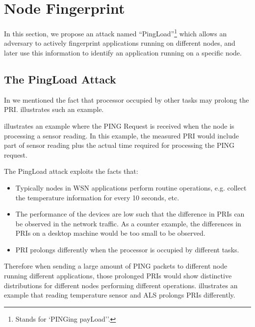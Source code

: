 \section{Node Fingerprint} \label{PingLoad}
In this section, we propose an attack named ``PingLoad''\footnote{Stands for `PINGing payLoad''.} which allows an adversary to actively fingerprint applications running on different nodes, and later use this information to identify an application running on a specific node.

\subsection{The PingLoad Attack}

In   we mentioned the fact that processor occupied by other tasks may prolong the PRI.   illustrates such an example.


 illustrates an example where the PING Request is received when the node is processing a sensor reading. In this example, the measured PRI would include part of  sensor reading plus the actual time required for processing the PING request.

The PingLoad attack exploits the facts that:
\begin{itemize}
	\item Typically nodes in WSN applications perform routine operations, e.g. collect the temperature  information for every 10 seconds, etc. 
	\item The performance of the devices are low such that the difference in PRIs can be observed in the network traffic. As a counter example, the differences in PRIs on a desktop machine would be too small to be observed.
	\item PRI prolongs differently when the processor is occupied by different tasks.
\end{itemize}

Therefore when sending a large amount of PING packets to different node running different applications, those prolonged PRIs would show distinctive distributions for different nodes performing different operations.  illustrates an example that reading temperature sensor and ALS prolongs PRIs differently. 

